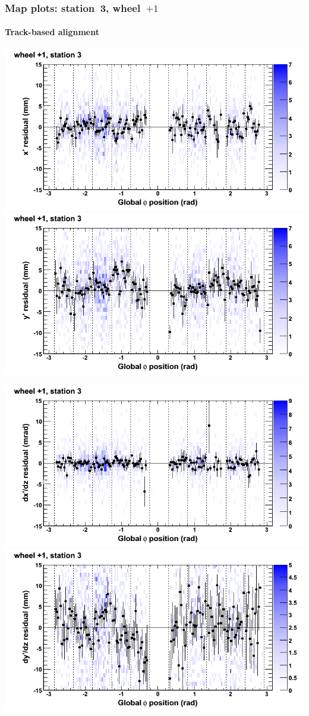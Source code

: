 \documentclass[compress]{beamer}
\begin{document}
\begin{frame}
\frametitle{Map plots: station~3, wheel~$+1$}
\framesubtitle{Track-based alignment}
\includegraphics[width=0.5\linewidth]{mapplots_re05/DTvsphi_st3whD_x.png}
\includegraphics[width=0.5\linewidth]{mapplots_re05/DTvsphi_st3whD_y.png}

\includegraphics[width=0.5\linewidth]{mapplots_re05/DTvsphi_st3whD_dxdz.png}
\includegraphics[width=0.5\linewidth]{mapplots_re05/DTvsphi_st3whD_dydz.png}
\end{frame}
\end{document}
